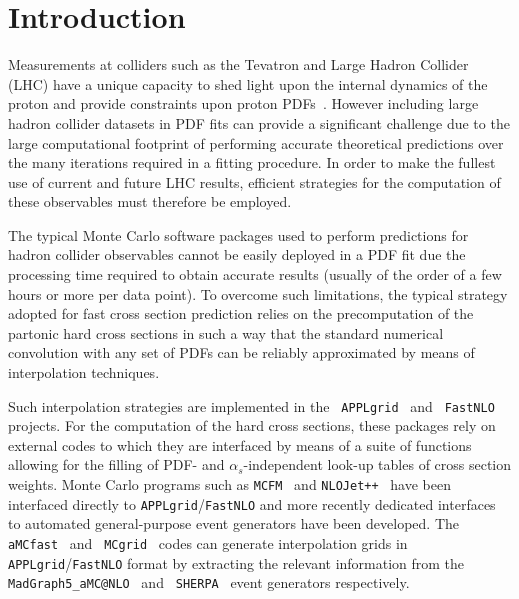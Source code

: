 \documentclass[preprint,12pt]{elsarticle}
\begin{document}
\clearpage


\section{Introduction}\label{sec:intro}

Measurements at colliders such as the Tevatron and Large Hadron Collider (LHC) have a unique capacity to shed light upon the internal dynamics 
of the proton and provide constraints upon proton PDFs~\cite{Rojo:2015acz}. However including large hadron collider datasets 
in PDF fits can provide a significant challenge due to the large computational footprint of performing accurate
theoretical predictions over the many iterations required in a fitting procedure. In order to make the fullest use of current 
and future LHC results, efficient strategies for the computation of these observables must therefore be employed. 

The typical Monte Carlo software packages used to perform predictions for 
hadron collider observables cannot be easily deployed in a PDF fit due the processing time 
required to obtain accurate results (usually of the order of a few hours or more per data
point). To overcome such limitations, the typical strategy
adopted for fast cross section prediction relies on the precomputation
of the partonic hard cross sections in such a way that the standard numerical
convolution with any set of PDFs can be reliably approximated by means of
interpolation techniques.

Such interpolation strategies are implemented in the {\tt
  APPLgrid}~\cite{Carli:2010rw} and {\tt
  FastNLO}~\cite{Wobisch:2011ij} projects. For the computation of the
hard cross sections, these packages rely on external codes to which
they are interfaced by means of a suite of functions allowing for the
filling of PDF- and $\alpha_s$-independent look-up tables of
cross section weights. Monte Carlo programs such as {\tt MCFM}~\cite{Campbell:2010ff}
and {\tt NLOJet++}~\cite{Nagy:2003tz} have been interfaced directly to
{\tt APPLgrid}/{\tt FastNLO} and more recently de\-di\-ca\-ted
interfaces to automated general-purpose event
generators have been developed. The {\tt
  aMCfast}~\cite{Bertone:2014zva} and {\tt
  MCgrid}~\cite{DelDebbio:2013kxa} codes can generate interpolation grids in {\tt APPLgrid}/{\tt FastNLO} format 
 by extracting the relevant information from the {\tt
  MadGraph5\_aMC@NLO}~\cite{Alwall:2014hca} and {\tt
  SHERPA}~\cite{Gleisberg:2008ta} event generators respectively.
\end{document}
